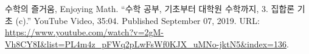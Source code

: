 \documentclass[11pt,openany]{article}
\begin{document}
%	



\vfill
\begin{thebibliography}{9}
	수학의 즐거움, Enjoying Math. ``수학 공부, 기초부터 대학원 수학까지, 3. 집합론 기초 (c).'' YouTube Video, 35:04. Published 
	September 07, 2019. URL: \url{https://www.youtube.com/watch?v=2gM-Vh8CY8I&list=PL4m4z_pFWq2pLwFsWf0KJX_uMNo-jktN5&index=136}.
\end{thebibliography}
\end{document}
